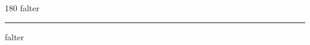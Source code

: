 
\begin{frame}
\begin{center}
\begin{turn}{180}
{\fontsize{2.5cm}{1em}\selectfont falter}
\end{turn}
\vspace{1em}\par  
\hrule
\vspace{1em}\par  
{\fontsize{2.5cm}{1em}\selectfont falter}
\end{center}
\end{frame}
